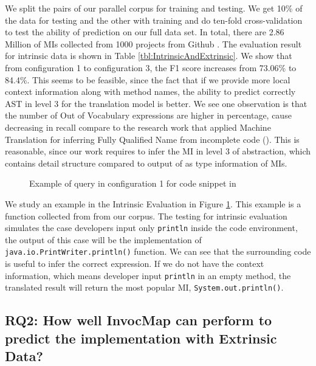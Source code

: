We split the pairs of our parallel corpus for training and testing. We get 10\% of the data for testing and the other with training and do ten-fold cross-validation to test the ability of prediction on our full data set. In total, there are 2.86 Million of MIs collected from 1000 projects from Github \cite{id:Github}.
The evaluation result for intrinsic data is shown in Table \ref{tbl:IntrinsicAndExtrinsic}. We show that from configuration 1 to configuration 3, the F1 score increases from 73.06\% to 84.4\%. This seems to be feasible, since the fact that if we provide more local context information along with method names, the ability to predict correctly AST in level 3 for the translation model is better. We see one observation is that the number of Out of Vocabulary expressions are higher in percentage, cause decreasing in recall compare to the research work that applied Machine Translation for inferring Fully Qualified Name from incomplete code (\cite{8453132}). This is reasonable, since our work requires to infer the MI in level 3 of abstraction, which contains detail structure compared to output of \cite{8453132} as type information of MIs. 
\begin{figure}[]
        \caption{\label{fig:example_in} Example of query in configuration 1 for code snippet in \cite{id:IntrinsicAndroidExample}}
      \end{figure}
We study an example in the Intrinsic Evaluation in Figure \ref{fig:example_in}. This example is a function collected from \cite{id:IntrinsicAndroidExample} from our corpus. The testing for intrinsic evaluation simulates the case developers input only \texttt{println} inside the code environment, the output of this case will be the implementation of \texttt{java.io.PrintWriter.println()} function. We can see that the surrounding code is useful to infer the correct expression. If we do not have the context information, which means developer input \texttt{println} in an empty method, the translated result will return the most popular MI, \texttt{System.out.println()}.

\subsection{RQ2: How well InvocMap can perform to predict the implementation with Extrinsic Data?}

